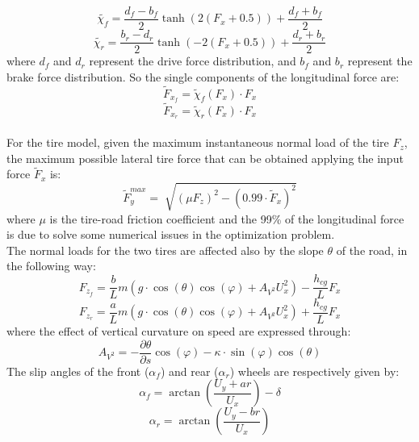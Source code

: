 \documentclass[a4paper, onecolumn, 11pt, twoside]{article}
\begin{document}
\begin{equation}
    \tilde{\chi_f} = \frac{d_f - b_f}{2}\tanh(2(F_x+0.5))+\frac{d_f+b_f}{2}
\end{equation}
\begin{equation}
    \tilde{\chi_r} = \frac{b_r-d_r}{2}\tanh(-2(F_x+0.5))+\frac{d_r+b_r}{2}
\end{equation}
where $d_f$ and $d_r$ represent the drive force distribution, and $b_f$ and $b_r$ represent the 
brake force distribution. So the single components of the longitudinal force are:
\begin{equation}
    \tilde{F}_{x_f} = \tilde{\chi}_f(F_x) \cdot F_x
\end{equation}
\begin{equation}
    \tilde{F}_{x_r} = \tilde{\chi}_r(F_x) \cdot F_x
\end{equation}
\\
For the tire model, given the maximum instantaneous normal load of the tire $F_z$, the maximum possible
lateral tire force that can be obtained applying the input force $\tilde{F}_x$ is:
\begin{equation}
    \tilde{F}_y^{max} = \sqrt[]{(\mu F_z)^2 - (0.99\cdot \tilde{F}_x)^2}
\end{equation}
where $\mu$ is the tire-road friction coefficient and the 99\%  of the longitudinal force is due to solve 
some numerical issues in the optimization problem. \\
The normal loads for the two tires are affected also by the slope $\theta$ of the road, in the following way:
\begin{equation}
    F_{z_f} = \frac{b}{L}m(g\cdot \cos(\theta)\cos(\varphi)+A_{V^2}U_x^2)-\frac{h_{cg}}{L}F_x
\end{equation}
\begin{equation}
    F_{z_r} = \frac{a}{L}m(g\cdot \cos(\theta)\cos(\varphi)+A_{V^2}U_x^2)+\frac{h_{cg}}{L}F_x
\end{equation}
where the effect of vertical curvature on speed are expressed through:
\begin{equation}
    A_{V^2} = -\frac{\partial \theta}{\partial s}\cos(\varphi)-\kappa\cdot \sin(\varphi)\cos(\theta) 
\end{equation}
The slip angles of the front ($\alpha_f$) and rear ($\alpha_r$) wheels are respectively given by:
\begin{equation}
    \alpha_f = \arctan \left(\frac{U_y+ar}{U_x}\right)-\delta
\end{equation}
\begin{equation}
    \alpha_r = \arctan \left(\frac{U_y-br}{U_x}\right)
\end{equation}
\end{document}

